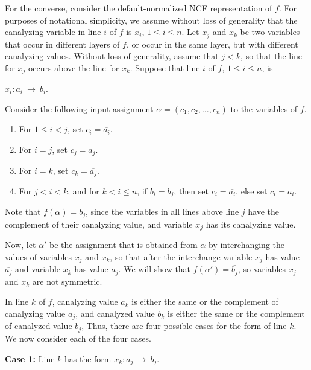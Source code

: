 For the converse, consider the default-normalized NCF representation of $f$. 
For purposes of notational simplicity, we assume without loss of generality that the
canalyzing variable in line $i$ of $f$ is $x_i$, $1 \leq i \leq n$.
Let  $x_j$ and $x_k$ be two variables that occur in different
layers of $f$, or occur in the same layer, but with different
canalyzing values.  Without loss of generality, 
assume that $j < k$, so that the line for
$x_j$ occurs above the line for $x_k$.
Suppose that line $i$ of $f$, $1 \leq i \leq n$, is 

\smallskip

\hspace*{1in}
$x_i : a_i ~\longrightarrow~ b_i$. 

\smallskip

\noindent
Consider the following input assignment $\alpha = (c_1, c_2, \ldots,  c_n)$ 
to the variables of $f$.
\begin{enumerate}
\item For $1 \leq i < j$, set $c_i = \overline{a_i}$. 
\item For $i = j$, set $c_j =a_j$. 
\item For $i = k$, set $c_k =\overline{a_j}$. 
\item For $j < i < k$, and for  $k < i \leq n$, 
if $b_i = b_j$, then set $c_i =  \overline{a_i}$,
else set $c_i =  a_i$.
\end{enumerate}
Note that $f(\alpha) = b_j$, since the variables in all lines above
line $j$ have the complement of their canalyzing value, and variable
$x_j$ has its canalyzing value.

\medskip

Now, let $\alpha'$ be the assignment that is obtained from $\alpha$
by interchanging the values of variables $x_j$ and $x_k$, so that
after the interchange variable $x_j$ has value $\overline{a_j}$ and
variable $x_k$ has value $a_j$.  We will show that $f(\alpha') =
\overline{b_j}$, so variables $x_j$ and $x_k$ are not symmetric.

In line $k$ of $f$, canalyzing value $a_k$ is either the same or
the complement of canalyzing value $a_j$, and canalyzed value $b_k$
is either the same or the complement of canalyzed value $b_j$,
Thus, there are four possible cases for the form of line $k$.  We
now consider each of the four cases.

\medskip

\noindent
{\bf Case 1:} Line $k$ has the form $x_k : a_j ~\longrightarrow~ b_j$.  

